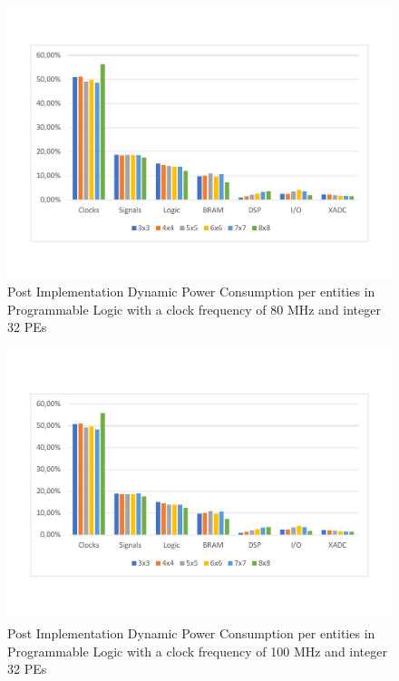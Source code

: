 \begin{itemize}
\begin{figure}[!htbp]
\end{figure}
\begin{figure}[!htbp]
\centering
\captionsetup{justification=centering}
\includegraphics[scale=0.6,angle=0]{./figure/graphs/power_pldyn_div_int32_freq_80mhz.pdf}
\caption{Post Implementation Dynamic Power Consumption per entities in Programmable Logic with a clock frequency of 80 MHz and integer 32 PEs}
\label{fig:dynpowint32ent80}
\end{figure}
\begin{figure}[!htbp]
\centering
\captionsetup{justification=centering}
\includegraphics[scale=0.6,angle=0]{./figure/graphs/power_pldyn_div_int32_freq_100mhz.pdf}
\caption{Post Implementation Dynamic Power Consumption per entities in Programmable Logic with a clock frequency of 100 MHz and integer 32 PEs}
\label{fig:dynpowint32ent100}
\end{figure}


\end{itemize}
